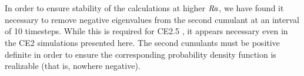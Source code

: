 \documentclass{jfm}
\newcommand{\Rayleigh}{\mbox{\textit{Ra}}}  %
\begin{document}
\appendix
\section{}\label{appA}
In order to ensure stability of the calculations at higher $\Rayleigh$, we have found it necessary to remove negative eigenvalues from the second cumulant at an interval of 10 timesteps.
While this is required for CE2.5 \citep{marston_qi_tobias_2019}, it appears necessary even in the CE2 simulations presented here.
The second cumulants must be positive definite in order to ensure the corresponding probability density function is realizable (that is, nowhere negative).




\end{document}
